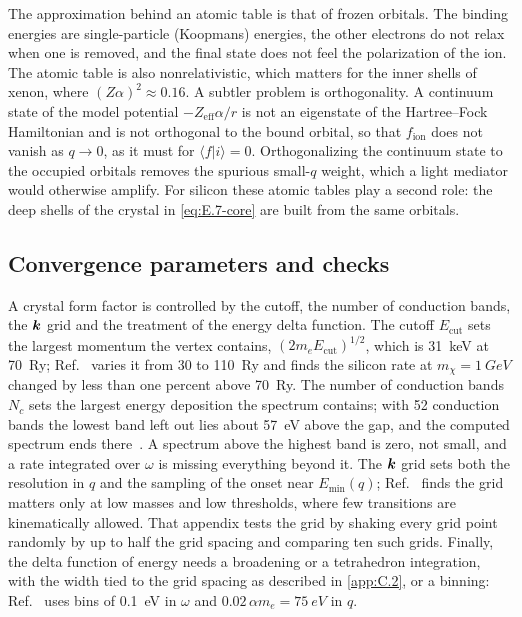 The approximation behind an atomic table is that of frozen orbitals. The binding energies are single-particle (Koopmans) energies, the other electrons do not relax when one is removed, and the final state does not feel the polarization of the ion. The atomic table is also nonrelativistic, which matters for the inner shells of xenon, where $(Z\alpha)^2 \approx 0.16$. A subtler problem is orthogonality. A continuum state of the model potential $-Z_{\mathrm{eff}}\alpha/r$ is not an eigenstate of the Hartree--Fock Hamiltonian and is not orthogonal to the bound orbital, so that $f_{\mathrm{ion}}$ does not vanish as $q \to 0$, as it must for $\langle f|i\rangle = 0$. Orthogonalizing the continuum state to the occupied orbitals removes the spurious small-$q$ weight, which a light mediator would otherwise amplify. For silicon these atomic tables play a second role: the deep shells of the crystal in \cref{eq:E.7-core} are built from the same orbitals.

\subsection{Convergence parameters and checks}

A crystal form factor is controlled by the cutoff, the number of conduction bands, the $\bm{k}$ grid and the treatment of the energy delta function. The cutoff $E_{\mathrm{cut}}$ sets the largest momentum the vertex contains, $(2m_eE_{\mathrm{cut}})^{1/2}$, which is \SI{31}{keV} at \SI{70}{Ry}; Ref.~\cite[Appendix~C]{essig2016direct} varies it from 30 to \SI{110}{Ry} and finds the silicon rate at $m_\chi = \SI{1}{GeV}$ changed by less than one percent above \SI{70}{Ry}. The number of conduction bands $N_c$ sets the largest energy deposition the spectrum contains; with 52 conduction bands the lowest band left out lies about \SI{57}{eV} above the gap, and the computed spectrum ends there~\cite[Sect.~4.2]{essig2016direct}. A spectrum above the highest band is zero, not small, and a rate integrated over $\omega$ is missing everything beyond it. The $\bm{k}$ grid sets both the resolution in $q$ and the sampling of the onset near $E_{\mathrm{min}}(q)$; Ref.~\cite[Appendix~C]{essig2016direct} finds the grid matters only at low masses and low thresholds, where few transitions are kinematically allowed. That appendix tests the grid by shaking every grid point randomly by up to half the grid spacing and comparing ten such grids. Finally, the delta function of energy needs a broadening or a tetrahedron integration, with the width tied to the grid spacing as described in \cref{app:C.2}, or a binning: Ref.~\cite[Sect.~4.2]{essig2016direct} uses bins of \SI{0.1}{eV} in $\omega$ and $0.02\,\alpha m_e = \SI{75}{eV}$ in $q$.

